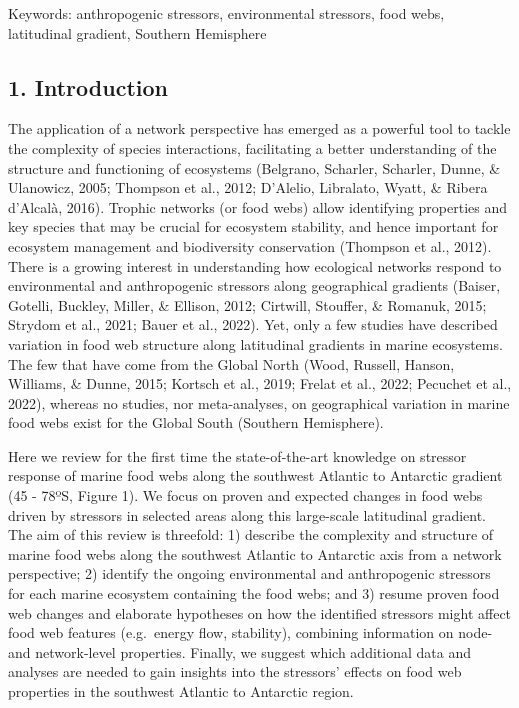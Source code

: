 \documentclass[
]{article}
\begin{document}
Keywords: anthropogenic stressors, environmental stressors, food webs,
latitudinal gradient, Southern Hemisphere

\hypertarget{introduction}{%
\subsection{1. Introduction}\label{introduction}}

The application of a network perspective has emerged as a powerful tool
to tackle the complexity of species interactions, facilitating a better
understanding of the structure and functioning of ecosystems (Belgrano,
Scharler, Scharler, Dunne, \& Ulanowicz, 2005; Thompson et al., 2012;
D'Alelio, Libralato, Wyatt, \& Ribera d'Alcalà, 2016). Trophic networks
(or food webs) allow identifying properties and key species that may be
crucial for ecosystem stability, and hence important for ecosystem
management and biodiversity conservation (Thompson et al., 2012). There
is a growing interest in understanding how ecological networks respond
to environmental and anthropogenic stressors along geographical
gradients (Baiser, Gotelli, Buckley, Miller, \& Ellison, 2012; Cirtwill,
Stouffer, \& Romanuk, 2015; Strydom et al., 2021; Bauer et al., 2022).
Yet, only a few studies have described variation in food web structure
along latitudinal gradients in marine ecosystems. The few that have come
from the Global North (Wood, Russell, Hanson, Williams, \& Dunne, 2015;
Kortsch et al., 2019; Frelat et al., 2022; Pecuchet et al., 2022),
whereas no studies, nor meta-analyses, on geographical variation in
marine food webs exist for the Global South (Southern Hemisphere).

Here we review for the first time the state-of-the-art knowledge on
stressor response of marine food webs along the southwest Atlantic to
Antarctic gradient (45 - 78ºS, Figure 1). We focus on proven and
expected changes in food webs driven by stressors in selected areas
along this large-scale latitudinal gradient. The aim of this review is
threefold: 1) describe the complexity and structure of marine food webs
along the southwest Atlantic to Antarctic axis from a network
perspective; 2) identify the ongoing environmental and anthropogenic
stressors for each marine ecosystem containing the food webs; and 3)
resume proven food web changes and elaborate hypotheses on how the
identified stressors might affect food web features (e.g.~energy flow,
stability), combining information on node- and network-level properties.
Finally, we suggest which additional data and analyses are needed to
gain insights into the stressors' effects on food web properties in the
southwest Atlantic to Antarctic region.
\end{document}

